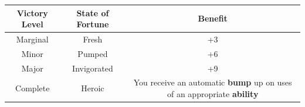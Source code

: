 \documentclass[
]{article}
\begin{document}
\begin{longtable}[]{@{}ccc@{}}
\toprule
\begin{minipage}[b]{0.13\columnwidth}\centering
Victory Level\strut
\end{minipage} & \begin{minipage}[b]{0.14\columnwidth}\centering
State of Fortune\strut
\end{minipage} & \begin{minipage}[b]{0.64\columnwidth}\centering
Benefit\strut
\end{minipage}\tabularnewline
\midrule
\endhead
\begin{minipage}[t]{0.13\columnwidth}\centering
Marginal\strut
\end{minipage} & \begin{minipage}[t]{0.14\columnwidth}\centering
Fresh\strut
\end{minipage} & \begin{minipage}[t]{0.64\columnwidth}\centering
+3\strut
\end{minipage}\tabularnewline
\begin{minipage}[t]{0.13\columnwidth}\centering
Minor\strut
\end{minipage} & \begin{minipage}[t]{0.14\columnwidth}\centering
Pumped\strut
\end{minipage} & \begin{minipage}[t]{0.64\columnwidth}\centering
+6\strut
\end{minipage}\tabularnewline
\begin{minipage}[t]{0.13\columnwidth}\centering
Major\strut
\end{minipage} & \begin{minipage}[t]{0.14\columnwidth}\centering
Invigorated\strut
\end{minipage} & \begin{minipage}[t]{0.64\columnwidth}\centering
+9\strut
\end{minipage}\tabularnewline
\begin{minipage}[t]{0.13\columnwidth}\centering
Complete\strut
\end{minipage} & \begin{minipage}[t]{0.14\columnwidth}\centering
Heroic\strut
\end{minipage} & \begin{minipage}[t]{0.64\columnwidth}\centering
You receive an automatic \textbf{bump} up on uses of an appropriate
\textbf{ability}\strut
\end{minipage}\tabularnewline
\bottomrule
\end{longtable}
\end{document}
